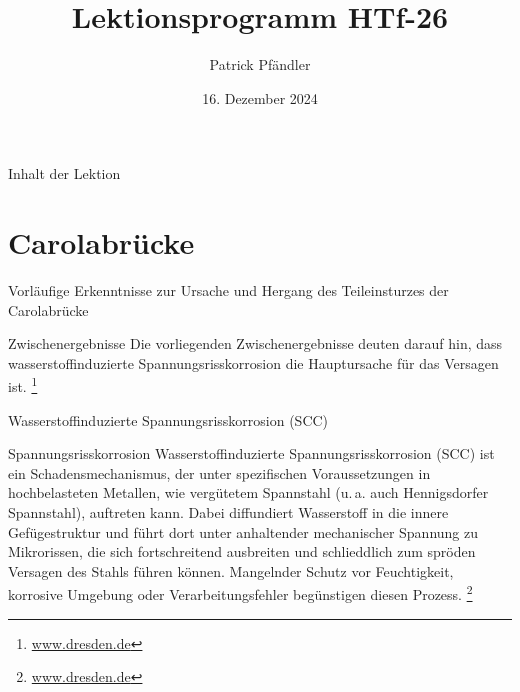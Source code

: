 \def\customoptions{aspectratio=169} %

\title{\textbf{Lektionsprogramm HTf-26}}
\author{Patrick Pfändler}
\date{16. Dezember 2024}




\frame{\titlepage}

\begin{frame}{Inhalt der Lektion}
	\tableofcontents
\end{frame}

\section{Carolabrücke}
\BlueSectionSlide

\begin{frame}{Vorläufige Erkenntnisse zur Ursache und Hergang des Teileinsturzes der Carolabrücke}
    \begin{block}{Zwischenergebnisse}
        Die vorliegenden Zwischenergebnisse deuten darauf hin, dass wasserstoffinduzierte Spannungsrisskorrosion die Hauptursache für das Versagen ist.
        \footnote{\href{        \footnote{https://www.dresden.de/media/pdf/presseamt/2024_12_11_Carolabruecke_Zusammenfassung-Ergebnisse.pdf}}{www.dresden.de}}
    \end{block}

\end{frame}

\begin{frame}{Wasserstoffinduzierte Spannungsrisskorrosion (SCC)}
    \begin{Definition_BS}{Spannungsrisskorrosion}
        Wasserstoffinduzierte Spannungsrisskorrosion (SCC) ist ein Schadensmechanismus, der unter spezifischen Voraussetzungen in
        hochbelasteten Metallen, wie vergütetem Spannstahl (u.\,a. auch Hennigsdorfer Spannstahl), auftreten kann. Dabei diffundiert Wasserstoff in die innere Gefügestruktur und führt dort unter anhaltender mechanischer Spannung zu Mikrorissen, die sich fortschreitend ausbreiten und
        schlieddlich zum spröden Versagen des Stahls führen können. Mangelnder Schutz vor Feuchtigkeit, korrosive Umgebung oder
        Verarbeitungsfehler begünstigen diesen Prozess.
        \footnote{\href{        \footnote{https://www.dresden.de/media/pdf/presseamt/2024_12_11_Carolabruecke_Zusammenfassung-Ergebnisse.pdf}}{www.dresden.de}}
    \end{Definition_BS}
\end{frame}


